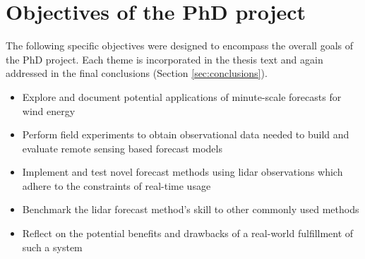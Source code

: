 \chapter{Objectives of the PhD project}
\label{sec:objectives}

The following specific objectives were designed to encompass the overall goals of the PhD project. Each theme is incorporated in the thesis text and again addressed in the final conclusions (Section \ref{sec:conclusions}).

\vspace{0.5cm}

\begin{itemize}
    \item Explore and document potential applications of minute-scale forecasts for wind energy
    \item Perform field experiments to obtain observational data needed to build and evaluate remote sensing based forecast models
    \item Implement and test novel forecast methods using lidar observations which adhere to the constraints of real-time usage
    \item Benchmark the lidar forecast method's skill to other commonly used methods
    \item Reflect on the potential benefits and drawbacks of a real-world fulfillment of such a system
\end{itemize}